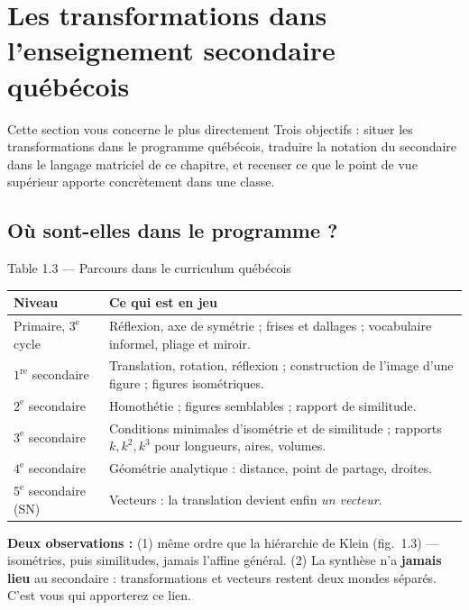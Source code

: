 \section{Les transformations dans l'enseignement secondaire québécois}

\begin{frame}{Cette section vous concerne le plus directement}
  \small Trois objectifs : situer les transformations dans le
  programme québécois, traduire la notation du secondaire dans le
  langage matriciel de ce chapitre, et recenser ce que le point de vue
  supérieur apporte concrètement dans une classe.
\end{frame}

\subsection{Où sont-elles dans le programme ?}
\begin{frame}{Table 1.3 --- Parcours dans le curriculum québécois}
  \tiny
  \begin{center}
  \begin{tabular}{p{2.6cm}p{8.6cm}}
    \toprule
    Niveau & Ce qui est en jeu \\
    \midrule
    Primaire, $3^{\text{e}}$ cycle
      & Réflexion, axe de symétrie ; frises et dallages ; vocabulaire
        informel, pliage et miroir. \\
    $1^{\text{re}}$ secondaire
      & Translation, rotation, réflexion ; construction de l'image
        d'une figure ; figures isométriques. \\
    $2^{\text{e}}$ secondaire
      & Homothétie ; figures semblables ; rapport de similitude. \\
    $3^{\text{e}}$ secondaire
      & Conditions minimales d'isométrie et de similitude ; rapports
        $k,k^2,k^3$ pour longueurs, aires, volumes. \\
    $4^{\text{e}}$ secondaire
      & Géométrie analytique : distance, point de partage, droites. \\
    $5^{\text{e}}$ secondaire (SN)
      & Vecteurs : la translation devient enfin \emph{un vecteur}. \\
    \bottomrule
  \end{tabular}
  \end{center}
  \normalsize
  \vspace{4pt}
  \small \textbf{Deux observations :} (1) même ordre que la hiérarchie
  de Klein (fig.~1.3) --- isométries, puis similitudes, jamais l'affine
  général. (2) La synthèse n'a \textbf{jamais lieu} au secondaire :
  transformations et vecteurs restent deux mondes séparés. C'est vous
  qui apporterez ce lien.
\end{frame}

